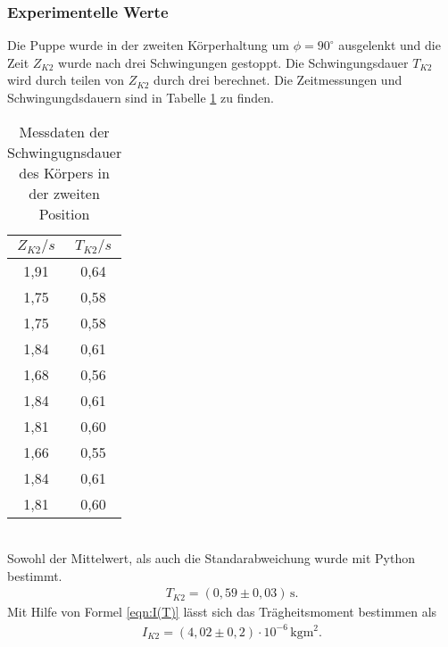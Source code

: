\subsubsection{Experimentelle Werte}
Die Puppe wurde in der zweiten Körperhaltung um $\phi = 90^{\circ}$ ausgelenkt und die Zeit $Z_{K2}$
wurde nach drei Schwingungen gestoppt. Die Schwingungsdauer $T_{K2}$ wird durch teilen von $Z_{K2}$
durch drei berechnet. Die Zeitmessungen und Schwingungdsdauern sind in Tabelle \ref{tab:Koerper2} zu finden.
\begin{table}
  \centering
  \caption{Messdaten der Schwingugnsdauer des Körpers in der zweiten Position}
  \label{tab:Koerper2}
  \begin{tabular}{c c}
    \toprule
    $Z_{K2}/s$ & $T_{K2}/s$ \\
    \midrule
    1,91 & 0,64 \\
    1,75 & 0,58 \\
    1,75 & 0,58 \\
    1,84 & 0,61 \\
    1,68 & 0,56 \\
    1,84 & 0,61 \\
    1,81 & 0,60 \\
    1,66 & 0,55 \\
    1,84 & 0,61 \\
    1,81 & 0,60 \\
    \bottomrule
  \end{tabular}
\end{table}
\\
Sowohl der Mittelwert, als auch die Standarabweichung wurde mit Python bestimmt.
\begin{align*}
  T_{K2} = (0{,}59 \pm 0{,}03)\, \mathrm{s} .
\end{align*}
Mit Hilfe von Formel \ref{eqn:I(T)} lässt sich das Trägheitsmoment bestimmen als
\begin{align*}
  I_{K2} = (4{,}02 \pm 0{,}2) \cdot 10^{-6}\, \mathrm{kgm^2}.
\end{align*}
\cite{sample}